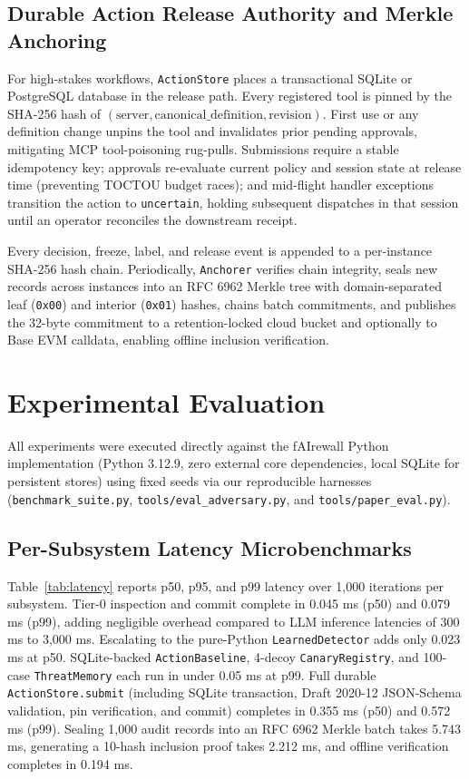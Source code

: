 \documentclass[conference]{IEEEtran}
\begin{document}
\subsection{Durable Action Release Authority and Merkle Anchoring}
For high-stakes workflows, \texttt{ActionStore} places a transactional SQLite or PostgreSQL database in the release path. Every registered tool is pinned by the SHA-256 hash of $(\text{server}, \text{canonical\_definition}, \text{revision})$. First use or any definition change unpins the tool and invalidates prior pending approvals, mitigating MCP tool-poisoning rug-pulls. Submissions require a stable idempotency key; approvals re-evaluate current policy and session state at release time (preventing TOCTOU budget races); and mid-flight handler exceptions transition the action to \texttt{uncertain}, holding subsequent dispatches in that session until an operator reconciles the downstream receipt.

Every decision, freeze, label, and release event is appended to a per-instance SHA-256 hash chain. Periodically, \texttt{Anchorer} verifies chain integrity, seals new records across instances into an RFC 6962 Merkle tree \cite{laurie2013rfc6962} with domain-separated leaf (\texttt{0x00}) and interior (\texttt{0x01}) hashes, chains batch commitments, and publishes the 32-byte commitment to a retention-locked cloud bucket and optionally to Base EVM calldata, enabling offline inclusion verification.

\section{Experimental Evaluation}

All experiments were executed directly against the fAIrewall Python implementation (Python 3.12.9, zero external core dependencies, local SQLite for persistent stores) using fixed seeds via our reproducible harnesses (\texttt{benchmark\_suite.py}, \texttt{tools/eval\_adversary.py}, and \texttt{tools/paper\_eval.py}).

\subsection{Per-Subsystem Latency Microbenchmarks}
Table~\ref{tab:latency} reports p50, p95, and p99 latency over 1,000 iterations per subsystem. Tier-0 inspection and commit complete in 0.045 ms (p50) and 0.079 ms (p99), adding negligible overhead compared to LLM inference latencies of 300 ms to 3,000 ms. Escalating to the pure-Python \texttt{LearnedDetector} adds only 0.023 ms at p50. SQLite-backed \texttt{ActionBaseline}, 4-decoy \texttt{CanaryRegistry}, and 100-case \texttt{ThreatMemory} each run in under 0.05 ms at p99. Full durable \texttt{ActionStore.submit} (including SQLite transaction, Draft 2020-12 JSON-Schema validation, pin verification, and commit) completes in 0.355 ms (p50) and 0.572 ms (p99). Sealing 1,000 audit records into an RFC 6962 Merkle batch takes 5.743 ms, generating a 10-hash inclusion proof takes 2.212 ms, and offline verification completes in 0.194 ms.
\end{document}
